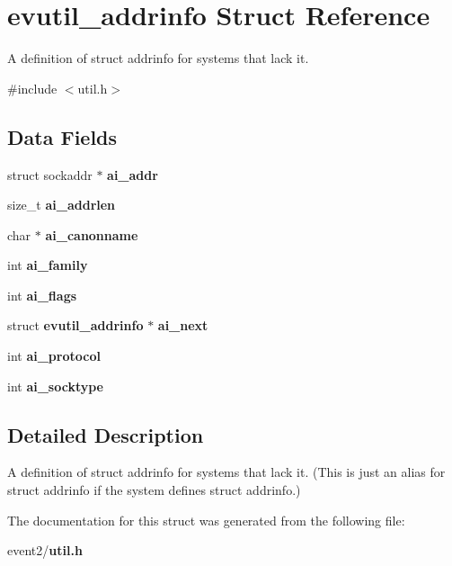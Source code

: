 \section{evutil\_\-addrinfo Struct Reference}
\label{structevutil__addrinfo}


A definition of struct addrinfo for systems that lack it.  


{\ttfamily \#include $<$util.h$>$}\subsection*{Data Fields}
\begin{DoxyCompactItemize}
\item 
struct sockaddr $\ast$ {\bfseries ai\_\-addr}\label{structevutil__addrinfo_a03bb6b5dd64b7f1b8efaf84c33155021}

\item 
size\_\-t {\bfseries ai\_\-addrlen}\label{structevutil__addrinfo_a7b464658586c499f9b1c07ef5232dc73}

\item 
char $\ast$ {\bfseries ai\_\-canonname}\label{structevutil__addrinfo_a6aefaa0538049a9fb6b310dc7acda59a}

\item 
int {\bfseries ai\_\-family}\label{structevutil__addrinfo_adefd4daf8b9588126bf07485f5c6f1a8}

\item 
int {\bfseries ai\_\-flags}\label{structevutil__addrinfo_a2246f6ec1b79105a6b7f0708f92076e3}

\item 
struct {\bf evutil\_\-addrinfo} $\ast$ {\bfseries ai\_\-next}\label{structevutil__addrinfo_a3227402ff2166be12932dfcef51d1ccc}

\item 
int {\bfseries ai\_\-protocol}\label{structevutil__addrinfo_adf0e2f668f541cfc7f8004850fcae6ce}

\item 
int {\bfseries ai\_\-socktype}\label{structevutil__addrinfo_ae935fc97b04cfaedbb7d1726b7c1190a}

\end{DoxyCompactItemize}


\subsection{Detailed Description}
A definition of struct addrinfo for systems that lack it. (This is just an alias for struct addrinfo if the system defines struct addrinfo.) 

The documentation for this struct was generated from the following file:\begin{DoxyCompactItemize}
\item 
event2/{\bf util.h}\end{DoxyCompactItemize}
